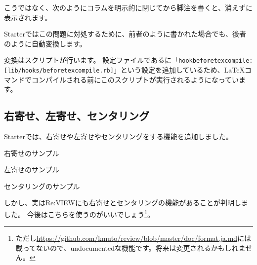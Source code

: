 こうではなく、次のようにコラムを明示的に閉じてから脚注を書くと、消えずに表示されます。

\begin{starterprogram}\end{starterprogram}

Starterではこの問題に対処するために、前者のように書かれた場合でも、後者のように自動変換します。

変換はスクリプトが行います。
設定ファイルであるに「\texttt{hook\textunderscore{}beforetexcompile: [lib/hooks/beforetexcompile.rb]}」という設定を追加しているため、\LaTeX{}コマンドでコンパイルされる前にこのスクリプトが実行されるようになっています。

\subsection*{右寄せ、左寄せ、センタリング}
\label{sec:1-1-13}

Starterでは、右寄せや左寄せやセンタリングをする機能を追加しました。

\begin{starterprogram}\end{starterprogram}
\noindent
{}

\starterresult
\begin{flushright}
右寄せのサンプル
\end{flushright}
\begin{flushleft}
左寄せのサンプル
\end{flushleft}
\begin{center}
センタリングのサンプル
\end{center}
\endstarterresult

しかし、実はRe:VIEWにも右寄せとセンタリングの機能があることが判明しました。
今後はこちらを使うのがいいでしょう\footnote{ただし\url{https://github.com/kmuto/review/blob/master/doc/format.ja.md}には載ってないので、undocumentedな機能です。将来は変更されるかもしれません。}。

